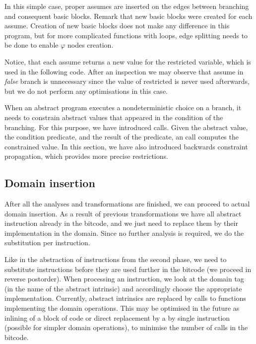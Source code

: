 \begin{example}
In this simple case, proper assumes are inserted on the edges between branching
and consequent basic blocks. Remark that new basic blocks were created for
each assume. Creation of new basic blocks does not make any difference in this
program, but for more complicated functions with loops, edge splitting needs
to be done to enable $\varphi$ nodes creation.

Notice, that each assume returns a new value for the restricted variable, which
is used in the following code.  After an inspection we may observe that assume
in \emph{false} branch is unnecessary since the value of restricted
 is never used afterwards, but we do not perform any
optimisations in this case.
\end{example}

\begin{summary}
When an abstract program executes a nondeterministic choice on a branch, it
needs to constrain abstract values that appeared in the condition of the
branching. For this purpose, we have introduced  calls. Given
the abstract value, the condition predicate, and the result of the
predicate, an  call computes the constrained value. In this
section, we have also introduced backwards constraint propagation, which
provides more precise restrictions.
\end{summary}

\subsection{Domain insertion}

After all the analyses and transformations are finished, we can proceed to
actual domain insertion. As a result of previous transformations we have all
abstract instruction already in the bitcode, and we just need to replace them by
their implementation in the domain. Since no further analysis is required, we do
the substitution per instruction.

Like in the abstraction of instructions from the second phase, we need to
substitute instructions before they are used further in the bitcode (we proceed
in reverse postorder). When processing an instruction, we look at the domain tag
(in the name of the abstract intrinsic) and accordingly choose the appropriate
implementation. Currently, abstract intrinsics are replaced by calls to functions
implementing the domain operations. This may be optimised in the future as
inlining of a block of code or direct replacement by a by single instruction
(possible for simpler domain operations), to minimise the number of calls in the
bitcode.


